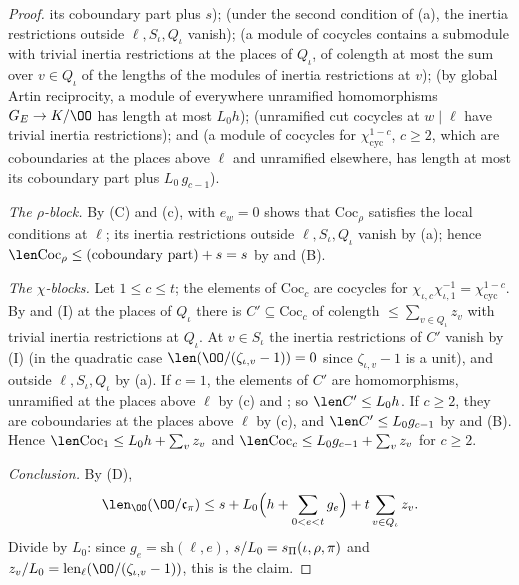 \begin{proof}
its coboundary part plus $s$);  (under the second condition of (a), the inertia restrictions
outside $\ell,S_\iota,Q_\iota$ vanish);  (a module of cocycles contains a submodule with trivial inertia
restrictions at the places of $Q_\iota$, of colength at most the sum over $v\in Q_\iota$ of the lengths of the modules of inertia restrictions at $v$);
 (by global Artin reciprocity, a module of everywhere unramified homomorphisms
$G_E\to K/\OO$ has length at most $L_0h$);  (unramified cut cocycles at $w\mid\ell$ have trivial inertia
restrictions); and  (a module of cocycles for $\chi_{\mathrm{cyc}}^{1-c}$, $c\ge2$,
which are coboundaries at the places above $\ell$ and unramified elsewhere, has length at most its coboundary part plus $L_0\,g_{c-1}$).

\emph{The $\rho$-block.} By (C) and (c),  with $e_w=0$ shows that
$\mathrm{Coc}_\rho$ satisfies the local conditions at $\ell$; its inertia restrictions outside $\ell,S_\iota,Q_\iota$ vanish by (a); hence
$\len\mathrm{Coc}_\rho\le(\text{coboundary part})+s=s$ by  and (B).

\emph{The $\chi$-blocks.} Let $1\le c\le t$; the elements of $\mathrm{Coc}_c$ are cocycles for $\chi_{\iota,c}\chi_{\iota,1}^{-1}=\chi_{\mathrm{cyc}}^{1-c}$.
By  and (I) at the places of $Q_\iota$ there is $C'\subseteq\mathrm{Coc}_c$ of colength $\le\sum_{v\in Q_\iota}z_v$
with trivial inertia restrictions at $Q_\iota$. At $v\in S_\iota$ the inertia restrictions of $C'$ vanish by (I) (in the quadratic case
$\len(\OO/(\zeta_{\iota,v}-1))=0$ since $\zeta_{\iota,v}-1$ is a unit), and outside $\ell,S_\iota,Q_\iota$ by (a). If $c=1$, the elements of $C'$ are
homomorphisms, unramified at the places above $\ell$ by (c) and ; so $\len C'\le L_0h$. If $c\ge2$, they are
coboundaries at the places above $\ell$ by (c), and $\len C'\le L_0g_{c-1}$ by 
and (B). Hence $\len\mathrm{Coc}_1\le L_0h+\sum_vz_v$ and $\len\mathrm{Coc}_c\le L_0g_{c-1}+\sum_vz_v$ for $c\ge2$.

\emph{Conclusion.} By (D),
\[
\len_\OO(\OO/\mathfrak c_\pi)\le s+L_0\Bigl(h+\sum_{0<e<t}g_e\Bigr)+t\sum_{v\in Q_\iota}z_v .
\]
Divide by $L_0$: since $g_e=\mathrm{sh}(\ell,e)$, $s/L_0=s_{\Pi}(\iota,\rho,\pi)$ and $z_v/L_0=\linkNsellen(\OO/(\zeta_{\iota,v}-1))$, this is the
claim.
\end{proof}

